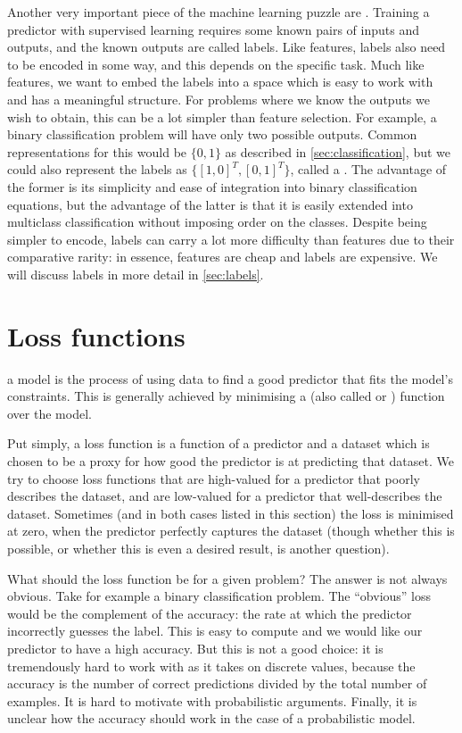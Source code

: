     Another very important piece of the machine learning puzzle are . Training a predictor with supervised learning requires some known pairs of inputs and outputs, and the known outputs are called labels. Like features, labels also need to be encoded in some way, and this depends on the specific task. Much like features, we want to embed the labels into a space which is easy to work with and has a meaningful structure. For problems where we know the outputs we wish to obtain, this can be a lot simpler than feature selection. For example, a binary classification problem will have only two possible outputs. Common representations for this would be $\{0, 1\}$ as described in \autoref{sec:classification}, but we could also represent the labels as $\{[1, 0]^T, [0, 1]^T\}$, called a . The advantage of the former is its simplicity and ease of integration into binary classification equations, but the advantage of the latter is that it is easily extended into multiclass classification without imposing order on the classes. Despite being simpler to encode, labels can carry a lot more difficulty than features due to their comparative rarity: in essence, features are cheap and labels are expensive. We will discuss labels in more detail in \autoref{sec:labels}.

\section{Loss functions}
\label{sec:training}
    
     a model is the process of using data to find a good predictor that fits the model's constraints. This is generally achieved by minimising a  (also called  or ) function over the model.

    Put simply, a loss function is a function of a predictor and a dataset which is chosen to be a proxy for how good the predictor is at predicting that dataset. We try to choose loss functions that are high-valued for a predictor that poorly describes the dataset, and are low-valued for a predictor that well-describes the dataset. Sometimes (and in both cases listed in this section) the loss is minimised at zero, when the predictor perfectly captures the dataset (though whether this is possible, or whether this is even a desired result, is another question).

    What should the loss function be for a given problem? The answer is not always obvious. Take for example a binary classification problem. The ``obvious'' loss would be the complement of the accuracy: the rate at which the predictor incorrectly guesses the label. This is easy to compute and we would like our predictor to have a high accuracy. But this is not a good choice: it is tremendously hard to work with as it takes on discrete values, because the accuracy is the number of correct predictions divided by the total number of examples. It is hard to motivate with probabilistic arguments. Finally, it is unclear how the accuracy should work in the case of a probabilistic model.

